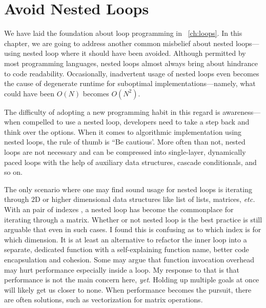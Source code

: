 
\chapter{Avoid Nested Loops} \label{ch:loop-thinning}

We have laid the foundation about loop programming in ~\autoref{ch:loops}.
In this chapter, we are going to address another common misbelief about nested loops---using
nested loop where it should have been avoided.
Although permitted by most programming languages, nested loops almost always bring about
hindrance to code readability.
Occasionally, inadvertent usage of nested loops even becomes the cause of degenerate runtime for
suboptimal implementations---namely, what could have been $O(N)$ becomes $O(N^2)$.


The difficulty of adopting a new programming habit in this regard is
awareness---when compelled to use a nested loop, developers need to take a step back
and think over the options.
When it comes to algorithmic implementation using nested loops, the rule of thumb is ``Be cautious'.
More often than not, nested loops are not necessary and can be compressed into single-layer,
dynamically paced loops with the help of auxiliary data structures, cascade conditionals, and so on.


The only scenario where one may find sound usage for nested loops is iterating through $2$D or
higher dimensional data structures like list of lists, matrices, \textit{etc.}
With an pair of indexes , a nested loop
has become the commonplace for iterating through a matrix.
Whether or not nested loop is the best practice is still arguable that even in such cases.
I found this is confusing as to which index is for which dimension.
It is at least an alternative to refactor the inner loop into a separate, dedicated
function with a self-explaining function name, better code encapsulation and cohesion.
Some may argue that function invocation overhead may hurt performance especially inside a loop.
My response to that is that performance is not the main concern here, \emph{yet}.
Holding up multiple goals at once will likely get us closer to none.
When performance becomes the pursuit, there are often solutions, such as vectorization for
matrix operations.


